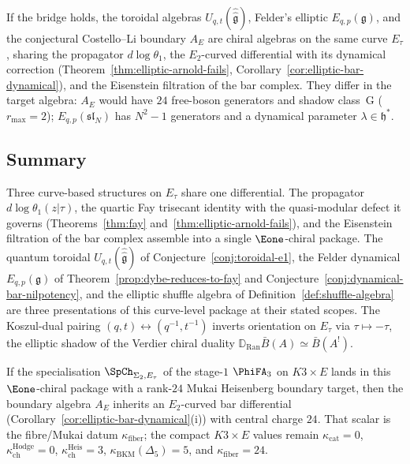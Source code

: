 \begin{remark}
If the bridge holds, the toroidal algebras
$U_{q,t}(\hat{\hat{\mathfrak{g}}})$, Felder's elliptic
$E_{q,p}(\mathfrak{g})$, and the conjectural Costello--Li boundary
$A_E$ are chiral algebras on the same curve $E_\tau$, sharing the
propagator $d\log\theta_1$, the $E_2$-curved differential with its
dynamical correction (Theorem~\ref{thm:elliptic-arnold-fails},
Corollary~\ref{cor:elliptic-bar-dynamical}), and the Eisenstein
filtration of the bar complex. They differ in the target algebra:
$A_E$ would have $24$ free-boson generators and shadow class~G
($r_{\max}=2$); $E_{q,p}(\mathfrak{sl}_N)$ has $N^2-1$ generators and
a dynamical parameter $\lambda \in \mathfrak{h}^*$.
\end{remark}

\subsection{Summary}
\label{subsec:toroidal-elliptic-summary}

Three curve-based structures on $E_\tau$ share one differential. The
propagator $d\log\theta_1(z|\tau)$, the quartic Fay trisecant
identity with the quasi-modular defect it governs
(Theorems~\ref{thm:fay} and~\ref{thm:elliptic-arnold-fails}), and the
Eisenstein filtration of the bar complex assemble into a single
$\Eone$-chiral package. The quantum toroidal
$U_{q,t}(\hat{\hat{\mathfrak{g}}})$ of
Conjecture~\ref{conj:toroidal-e1}, the Felder dynamical
$E_{q,p}(\mathfrak{g})$ of Theorem~\ref{prop:dybe-reduces-to-fay}
and Conjecture~\ref{conj:dynamical-bar-nilpotency}, and the elliptic
shuffle algebra of Definition~\ref{def:shuffle-algebra} are three
presentations of this curve-level package at their stated scopes. The Koszul-dual pairing
$(q,t) \leftrightarrow (q^{-1},t^{-1})$ inverts orientation on
$E_\tau$ via $\tau \mapsto -\tau$, the elliptic shadow of the Verdier
chiral duality $\mathbb{D}_{\mathrm{Ran}}\bar{B}(A) \simeq \bar{B}(A^!)$.

If the specialisation $\SpCh_{\Sigma_2,E_\tau}$ of the stage-$1$
$\PhiFA_3$ on $K3 \times E$ lands in this $\Eone$-chiral package with a
rank-$24$ Mukai Heisenberg boundary target, then the boundary algebra
$A_E$ inherits an $E_2$-curved bar differential
(Corollary~\ref{cor:elliptic-bar-dynamical}(i)) with central charge
$24$. That scalar is the fibre/Mukai datum $\kappa_{\mathrm{fiber}}$;
the compact $K3\times E$ values remain
$\kappa_{\mathrm{cat}} = 0$, $\kappa_{\mathrm{ch}}^{\mathrm{Hodge}} = 0$,
$\kappa_{\mathrm{ch}}^{\mathrm{Heis}} = 3$,
$\kappa_{\mathrm{BKM}}(\Delta_5) = 5$, and $\kappa_{\mathrm{fiber}} = 24$.



